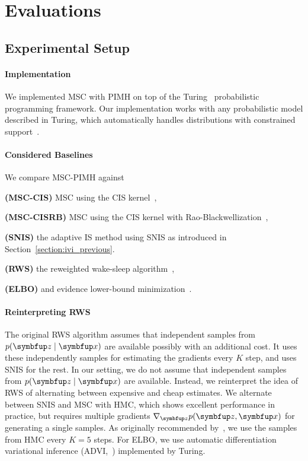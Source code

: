 
\section{Evaluations}\label{section:eval}
\subsection{Experimental Setup}
\paragraph{Implementation}
We implemented MSC with PIMH on top of the Turing~\citep{ge2018t} probabilistic programming framework.
Our implementation works with any probabilistic model described in Turing, which automatically handles distributions with constrained support~\citep{JMLR:v18:16-107}.

\paragraph{Considered Baselines}
We compare MSC-PIMH against
\begin{enumerate*}[label=\textbf{(\roman*)}]
  \item \textbf{(MSC-CIS)} MSC using the CIS kernel~\citep{NEURIPS2020_b2070693}, 
  \item \textbf{(MSC-CISRB)} MSC using the CIS kernel with Rao-Blackwellization~\citep{NEURIPS2020_b2070693},
  \item \textbf{(SNIS)} the adaptive IS method using SNIS as introduced in Section~\ref{section:ivi_previous}.
  \item \textbf{(RWS)} the reweighted wake-sleep algorithm~\citep{DBLP:journals/corr/BornscheinB14}, 
  \item \textbf{(ELBO)} and evidence lower-bound minimization~\citep{pmlr-v33-ranganath14, JMLR:v18:16-107}.
\end{enumerate*}

\paragraph{Reinterpreting RWS}
The original RWS algorithm assumes that independent samples from \(p(\vz\mid\vx)\) are available possibly with an additional cost.
It uses these independently samples for estimating the gradients every \(K\) step, and uses SNIS for the rest.
In our setting, we do not assume that independent samples from \(p(\vz\mid\vx)\) are available.
Instead, we reinterpret the idea of RWS of alternating between expensive and cheap estimates.
We alternate between SNIS and MSC with HMC, which shows excellent performance in practice, but requires multiple gradients \(\nabla_{\vz} p(\vz, \vx)\) for generating a single samples.
As originally recommended by~\citet{DBLP:journals/corr/BornscheinB14}, we use the samples from HMC every \(K=5\) steps.
For ELBO, we use automatic differentiation variational inference (ADVI,~\citealt{JMLR:v18:16-107}) implemented by Turing.

